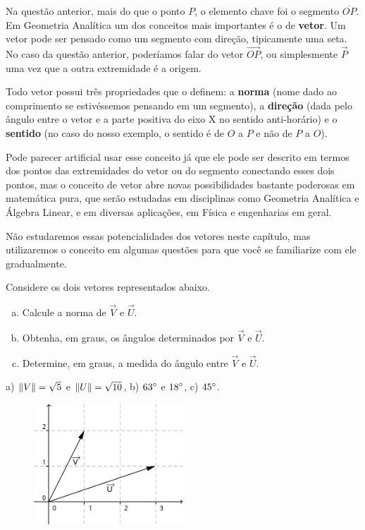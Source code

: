 \documentclass[main.tex]{subfiles}
\begin{document}
Na questão anterior, mais do que o ponto $P$, o elemento chave foi o segmento $\overline{OP}$. Em Geometria Analítica um dos conceitos mais importantes é o de \textbf{vetor}. Um vetor pode ser pensado como um segmento com direção, tipicamente uma seta. No caso da questão anterior, poderíamos falar do vetor $\overrightarrow{OP}$, ou simplesmente $\overrightarrow{P}$ uma vez que a outra extremidade é a origem.

Todo vetor possui três propriedades que o definem: a \textbf{norma} (nome dado ao comprimento se estivéssemos pensando em um segmento), a \textbf{direção} (dada pelo ângulo entre o vetor e a parte positiva do eixo X no sentido anti-horário) e o \textbf{sentido} (no caso do nosso exemplo, o sentido é de $O$ a $P$ e não de $P$ a $O$).

Pode parecer artificial usar esse conceito já que ele pode ser descrito em termos dos pontos das extremidades do vetor ou do segmento conectando esses dois pontos, mas o conceito de vetor abre novas possibilidades bastante poderosas em matemática pura, que serão estudadas em disciplinas como Geometria Analítica e Álgebra Linear, e em diversas aplicações, em Física e engenharias em geral.

Não estudaremos essas potencialidades dos vetores neste capítulo, mas utilizaremos o conceito em algumas questões para que você se familiarize com ele gradualmente.

\begin{questao}
Considere os dois vetores representados abaixo.
\begin{enumerate}[a)]
\item Calcule a norma de $\overrightarrow{V}$ e $\overrightarrow{U}$.
\item Obtenha, em graus, os ângulos determinados por $\overrightarrow{V}$ e $\overrightarrow{U}$.
\item Determine, em graus, a medida do ângulo entre $\overrightarrow{V}$ e $\overrightarrow{U}$.
\end{enumerate}
\end{questao}

\begin{gabarito}
	\begin{gabaritoQuestao}
		a) $\Arrowvert V \Arrowvert = \sqrt{5}$ e $\Arrowvert U \Arrowvert = \sqrt{10}$, b) $63\degree$ e $18\degree$, c) $45\degree$.
	\end{gabaritoQuestao}
\end{gabarito}


\begin{figure}[h]
\centering
\includegraphics[width=0.5\textwidth]{./img/c4q6.png}
\end{figure}
\end{document}
